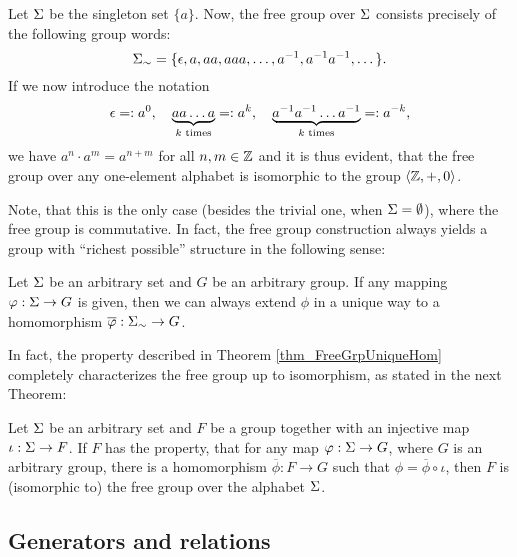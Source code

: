 \begin{example}
Let $\Sigma$ be the singleton set $\{a\}$. Now, the free group over $\Sigma$ consists precisely of the following group words:
\begin{equation*}
{\Sigma}_{\sim} = \{\epsilon, a, aa, aaa, \dots, {a}^{-1}, {a}^{-1}{a}^{-1},\dots\}.
\end{equation*}
If we now introduce the notation
\begin{equation*}
\epsilon =: a^0, \quad 
\underbrace{a a \dots a}_{k \text{ times}} =: a^k, \quad
\underbrace{{a}^{-1} {a}^{-1} \dots {a}^{-1}}_{k \text{ times}} =: a^{-k},
\end{equation*}
we have $a^n \cdot a^m = a^{n+m}$ for all $n,m \in \mathbb{Z}$ and it is thus evident, that the free group over any one-element alphabet is isomorphic to the group $\langle \mathbb{Z}, +, 0 \rangle$. 

Note, that this is the only case (besides the trivial one, when $\Sigma = \emptyset$), where the free group is commutative. In fact, the free group construction always yields a group with ``richest possible'' structure in the following sense:

\begin{theorem}
\label{thm_FreeGrpUniqueHom}
Let $\Sigma$ be an arbitrary set and $G$ be an arbitrary group. If any mapping $\varphi : \Sigma \to G$ is given, then we can always extend $\phi$ in a unique way to a homomorphism $\overline{\varphi}: {\Sigma}_{\sim} \to G$.
\end{theorem}

In fact, the property described in Theorem \ref{thm_FreeGrpUniqueHom} completely characterizes the free group up to isomorphism, as stated in the next Theorem:

\begin{theorem}
\label{thm_FreeGrpUnivMapProp}
Let $\Sigma$ be an arbitrary set and $F$ be a group together with an injective map $\iota : \Sigma \to F$. If $F$ has the property, that for any map $\varphi : \Sigma \to G$, where $G$ is an arbitrary group, there is a homomorphism $\overline{\phi} : F \to G$ such that $\phi = \overline{\phi} \circ \iota$,
then $F$ is (isomorphic to) the free group over the alphabet $\Sigma$.
\end{theorem}

\end{example}

\subsection{Generators and relations}

